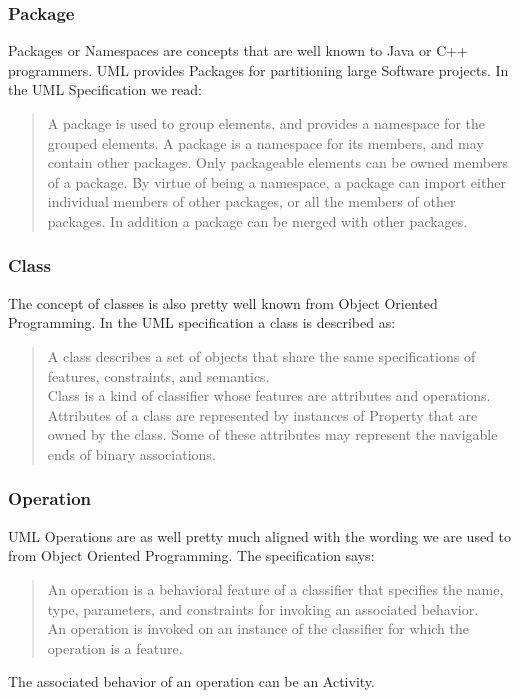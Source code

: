 \subsubsection{Package}
Packages or Namespaces are concepts that are well known to Java or C++ programmers. UML provides Packages for partitioning large Software projects. In the UML Specification we read:
\begin{quotation}
A package is used to group elements, and provides a namespace for the grouped elements.
A package is a namespace for its members, and may contain other packages. Only packageable elements can be owned
members of a package. By virtue of being a namespace, a package can import either individual members of other
packages, or all the members of other packages.
In addition a package can be merged with other packages.
\end{quotation}\cite{UML23Superstructure}
\subsubsection{Class}
The concept of classes is also pretty well known from Object Oriented Programming. In the UML specification a class is described as:
\begin{quotation}
A class describes a set of objects that share the same specifications of features, constraints, and semantics.\\
Class is a kind of classifier whose features are attributes and operations. Attributes of a class are represented by instances
of Property that are owned by the class. Some of these attributes may represent the navigable ends of binary associations.
\cite{UML23Superstructure}\end{quotation}
\subsubsection{Operation}
UML Operations are as well pretty much aligned with the wording we are used to from Object Oriented Programming. The specification says:
\begin{quotation}
An operation is a behavioral feature of a classifier that specifies the name, type, parameters, and constraints for invoking
an associated behavior.\\
An operation is invoked on an instance of the classifier for which the operation is a feature.
\end{quotation}
The associated behavior of an operation can be an Activity.
